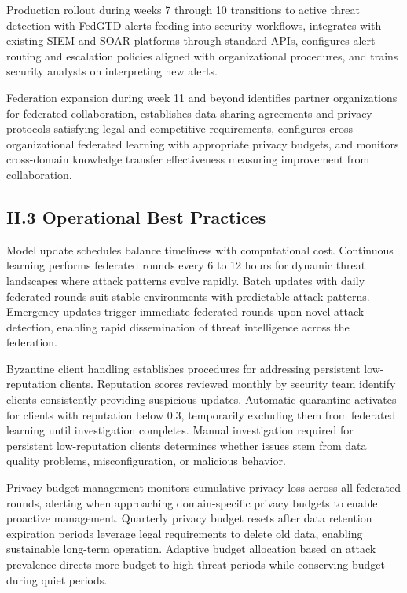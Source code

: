 \documentclass[12pt,a4paper]{article}
\theoremstyle{definition}
\begin{document}
Production rollout during weeks 7 through 10 transitions to active threat detection with FedGTD alerts feeding into security workflows, integrates with existing SIEM and SOAR platforms through standard APIs, configures alert routing and escalation policies aligned with organizational procedures, and trains security analysts on interpreting new alerts.

Federation expansion during week 11 and beyond identifies partner organizations for federated collaboration, establishes data sharing agreements and privacy protocols satisfying legal and competitive requirements, configures cross-organizational federated learning with appropriate privacy budgets, and monitors cross-domain knowledge transfer effectiveness measuring improvement from collaboration.

\subsection{H.3 Operational Best Practices}

Model update schedules balance timeliness with computational cost. Continuous learning performs federated rounds every 6 to 12 hours for dynamic threat landscapes where attack patterns evolve rapidly. Batch updates with daily federated rounds suit stable environments with predictable attack patterns. Emergency updates trigger immediate federated rounds upon novel attack detection, enabling rapid dissemination of threat intelligence across the federation.

Byzantine client handling establishes procedures for addressing persistent low-reputation clients. Reputation scores reviewed monthly by security team identify clients consistently providing suspicious updates. Automatic quarantine activates for clients with reputation below 0.3, temporarily excluding them from federated learning until investigation completes. Manual investigation required for persistent low-reputation clients determines whether issues stem from data quality problems, misconfiguration, or malicious behavior.

Privacy budget management monitors cumulative privacy loss across all federated rounds, alerting when approaching domain-specific privacy budgets to enable proactive management. Quarterly privacy budget resets after data retention expiration periods leverage legal requirements to delete old data, enabling sustainable long-term operation. Adaptive budget allocation based on attack prevalence directs more budget to high-threat periods while conserving budget during quiet periods.
\end{document}
